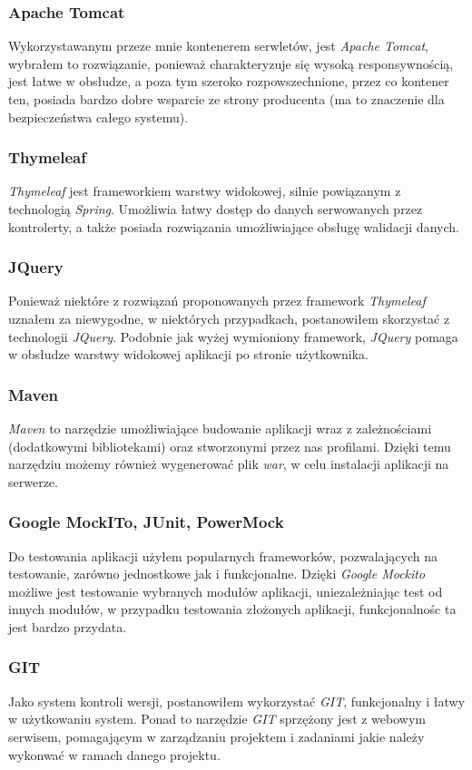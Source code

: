 \documentclass[a4paper, titlepage]{article}
\begin{document}
	\subsubsection{Apache Tomcat}
	Wykorzystawanym przeze mnie kontenerem serwletów, jest \textit{Apache Tomcat}, wybrałem to rozwiązanie, ponieważ charakteryzuje się wysoką responsywnością, jest łatwe w obsłudze, a poza tym szeroko rozpowszechnione, przez co kontener ten, posiada bardzo dobre wsparcie ze strony producenta (ma to znaczenie dla bezpieczeństwa całego systemu).
	\subsubsection{Thymeleaf}
	\textit{Thymeleaf} jest frameworkiem warstwy widokowej, silnie powiązanym z technologią \textit{Spring}. Umożliwia łatwy dostęp do danych serwowanych przez kontrolerty, a także posiada rozwiązania umożliwiające obsługę walidacji danych.
	\subsubsection{JQuery}
	Ponieważ niektóre z rozwiązań proponowanych przez framework \textit{Thymeleaf} uznałem za niewygodne, w niektórych przypadkach, postanowiłem skorzystać z technologii \textit{JQuery}. Podobnie jak wyżej wymioniony framework, \textit{JQuery} pomaga w obsłudze warstwy widokowej aplikacji po stronie użytkownika.
	\subsubsection{Maven}
	\textit{Maven} to narzędzie umożliwiające budowanie aplikacji wraz z zależnościami (dodatkowymi bibliotekami) oraz stworzonymi przez nas profilami. Dzięki temu narzędziu możemy również wygenerować plik \textit{war}, w celu instalacji aplikacji na serwerze.
	\subsubsection{Google MockITo, JUnit, PowerMock}
	Do testowania aplikacji użyłem popularnych frameworków, pozwalających na testowanie, zarówno jednostkowe jak i funkcjonalne. Dzięki \textit{Google Mockito} możliwe jest testowanie wybranych modułów aplikacji, uniezależniając test od innych modułów, w przypadku testowania złożonych aplikacji, funkcjonalnośc ta jest bardzo przydata.
	\subsubsection{GIT}
	Jako system kontroli wersji, postanowiłem wykorzystać \textit{GIT}, funkcjonalny i łatwy w użytkowaniu system. Ponad to narzędzie \textit{GIT} sprzężony jest z webowym serwisem, pomagającym w zarządzaniu projektem i zadaniami jakie należy wykonwać w ramach danego projektu.
\end{document}
